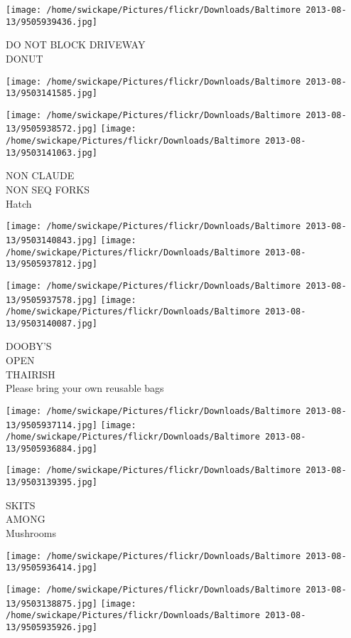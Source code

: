 \documentclass[10pt,letterpaper]{article}
\begin{document}
\vspace{0.25in}
\texttt{[image: /home/swickape/Pictures/flickr/Downloads/Baltimore 2013-08-13/9505939436.jpg]}

DO NOT BLOCK DRIVEWAY\\
DONUT
\pagebreak

\texttt{[image: /home/swickape/Pictures/flickr/Downloads/Baltimore 2013-08-13/9503141585.jpg]}

\vspace{0.25in}
\texttt{[image: /home/swickape/Pictures/flickr/Downloads/Baltimore 2013-08-13/9505938572.jpg]}
\texttt{[image: /home/swickape/Pictures/flickr/Downloads/Baltimore 2013-08-13/9503141063.jpg]}

NON CLAUDE\\
NON SEQ FORKS\\
Hatch
\pagebreak

\texttt{[image: /home/swickape/Pictures/flickr/Downloads/Baltimore 2013-08-13/9503140843.jpg]}
\texttt{[image: /home/swickape/Pictures/flickr/Downloads/Baltimore 2013-08-13/9505937812.jpg]}

\texttt{[image: /home/swickape/Pictures/flickr/Downloads/Baltimore 2013-08-13/9505937578.jpg]}
\texttt{[image: /home/swickape/Pictures/flickr/Downloads/Baltimore 2013-08-13/9503140087.jpg]}

DOOBY'S\\
OPEN\\
THAIRISH\\
Please bring your own reusable bags
\pagebreak

\texttt{[image: /home/swickape/Pictures/flickr/Downloads/Baltimore 2013-08-13/9505937114.jpg]}
\texttt{[image: /home/swickape/Pictures/flickr/Downloads/Baltimore 2013-08-13/9505936884.jpg]}

\texttt{[image: /home/swickape/Pictures/flickr/Downloads/Baltimore 2013-08-13/9503139395.jpg]}

SKITS\\
AMONG\\
Mushrooms
\pagebreak

\texttt{[image: /home/swickape/Pictures/flickr/Downloads/Baltimore 2013-08-13/9505936414.jpg]}

\vspace{0.25in}
\texttt{[image: /home/swickape/Pictures/flickr/Downloads/Baltimore 2013-08-13/9503138875.jpg]}
\texttt{[image: /home/swickape/Pictures/flickr/Downloads/Baltimore 2013-08-13/9505935926.jpg]}
\end{document}
